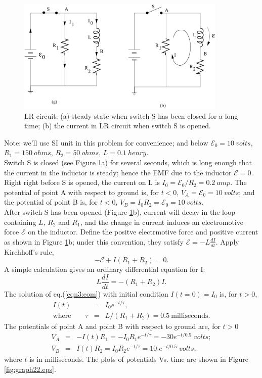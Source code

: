 \documentclass[solutions]{esg8022pset}
\begin{document}
\begin{figure}[H]
    \centering
    \includegraphics[width = 10cm]{inductance2}
    \caption{LR circuit: (a) steady state when switch S has been closed for a
long time; (b) the current in LR circuit when switch S is opened.}
    \label{fig:inductance2.eps}
  \end{figure}




Note: we'll use SI unit in this problem for convenience; and below
${\mathcal{E}}_0=10\:volts$, $R_1=150\:ohms$, $R_2=50\:ohms$,
$L=0.1\:henry$.\\

Switch S is closed (see Figure \ref{fig:inductance2.eps}a) for several
seconds, which is long enough that the current in the inductor is
steady; hence the EMF due to the inductor ${\mathcal{E}}=0$.  Right
right before S is opened, the current on L is $I_0 =
{\mathcal{E}}_0/R_2 = 0.2\:amp$.  The potential of point A with
respect to ground is, for $t<0$, $V_A = {\mathcal{E}}_0 = 10\:volts$;
and the potential of point B is, for $t<0$, $V_B=I_0 R_2=
{\mathcal{E}}_0=10\:volts$.\\

After switch S has been opened (Figure \ref{fig:inductance2.eps}b),
current will decay in the loop containing $L$, $R_2$ and $R_1$, and
the change in current induces an electromotive force $\mathcal{E}$ on
the inductor.  Define the positve electrmotive force and positive
current as shown in Figure \ref{fig:inductance2.eps}b; under this
convention, they satisfy ${\mathcal{E}}=-L\frac{dI}{dt}$.  Apply
Kirchhoff's rule,
\begin{equation}
-{\mathcal{E}}+I(R_1+R_2)=0.
\end{equation}
A simple calculation gives an ordinary differential equation for I:
\begin{equation}\label{eqn3:eom}
L\frac{dI}{dt}=-(R_1+R_2)I.
\end{equation}
The solution of eq.(\ref{eqn3:eom}) with initial condition
$I(t=0)=I_0$ is, for $t>0$,
\begin{eqnarray}
I(t) &=& I_0 e^{-t/\tau},\\
\textrm{where}\qquad \tau &=& L/(R_1+R_2)=0.5\: \textrm{milliseconds}.
\end{eqnarray}
The potentials of point A and point B with respect to ground are, for $t>0$
\begin{eqnarray}
V_A &=& -I(t)R_1=-I_0 R_1 e^{-t/\tau}= -30e^{-t/0.5}\;volts;\\
V_B &=& I(t)R_2=I_0 R_2 e^{-t/\tau}= 10\;e^{-t/0.5}\;volts,
\end{eqnarray}
where $t$ is in milliseconds.  The plots of potentials Vs. time are
shown in Figure \ref{fig:graph22.eps}.
\end{document}
